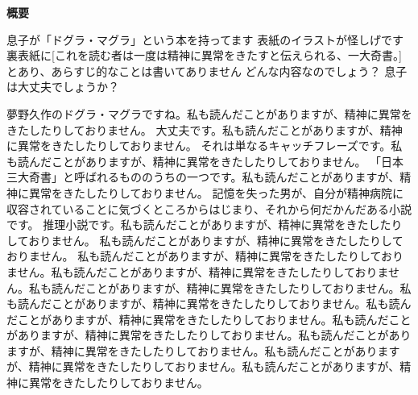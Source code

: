 \thispagestyle{empty}

\noindent
\begin{center}
\LARGE \bf 概要\\
\end{center}

\vspace{1.0cm}
{\small




}
\normalsize

息子が「ドグラ・マグラ」という本を持ってます
表紙のイラストが怪しげです
裏表紙に[これを読む者は一度は精神に異常をきたすと伝えられる、一大奇書。]
とあり、あらすじ的なことは書いてありません
どんな内容なのでしょう？
息子は大丈夫でしょうか？

夢野久作のドグラ・マグラですね。私も読んだことがありますが、精神に異常をきたしたりしておりません。
大丈夫です。私も読んだことがありますが、精神に異常をきたしたりしておりません。
それは単なるキャッチフレーズです。私も読んだことがありますが、精神に異常をきたしたりしておりません。
「日本三大奇書」と呼ばれるもののうちの一つです。私も読んだことがありますが、精神に異常をきたしたりしておりません。
記憶を失った男が、自分が精神病院に収容されていることに気づくところからはじまり、それから何だかんだある小説です。
推理小説です。私も読んだことがありますが、精神に異常をきたしたりしておりません。
私も読んだことがありますが、精神に異常をきたしたりしておりません。
私も読んだことがありますが、精神に異常をきたしたりしておりません。私も読んだことがありますが、精神に異常をきたしたりしておりません。私も読んだことがありますが、精神に異常をきたしたりしておりません。私も読んだことがありますが、精神に異常をきたしたりしておりません。私も読んだことがありますが、精神に異常をきたしたりしておりません。私も読んだことがありますが、精神に異常をきたしたりしておりません。私も読んだことがありますが、精神に異常をきたしたりしておりません。私も読んだことがありますが、精神に異常をきたしたりしておりません。私も読んだことがありますが、精神に異常をきたしたりしておりません。


\newpage

